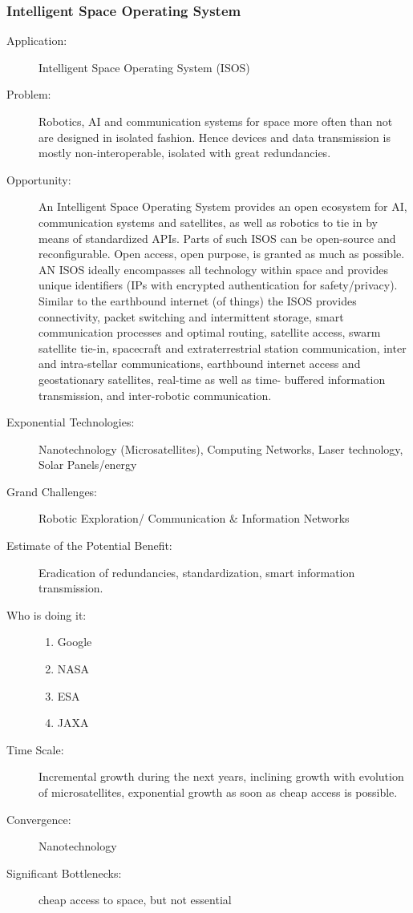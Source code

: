 \subsubsection{Intelligent Space Operating System}
\label{idea:isos}
\begin{description}
\item[Application:] Intelligent Space Operating System (ISOS)

\item[Problem:] Robotics, AI and communication systems for space more often than not are designed
in isolated fashion. Hence devices and data transmission is mostly non-interoperable, isolated
with great redundancies.

\item[Opportunity:] An Intelligent Space Operating System provides an open ecosystem for AI,
communication systems and satellites, as well as robotics to tie in by means of standardized
APIs. Parts of such ISOS can be open-source and reconfigurable. Open access, open purpose, is
granted as much as possible. AN ISOS ideally encompasses all technology within space and
provides unique identifiers (IPs with encrypted authentication for safety/privacy). Similar to the
earthbound internet (of things) the ISOS provides connectivity, packet switching and
intermittent storage, smart communication processes and optimal routing, satellite access, swarm
satellite tie-in, spacecraft and extraterrestrial station communication, inter and intra-stellar
communications, earthbound internet access and geostationary satellites, real-time as well as time-
buffered information transmission, and inter-robotic communication.

\item[Exponential Technologies:]    Nanotechnology (Microsatellites), Computing Networks, Laser
technology, Solar Panels/energy

\item[Grand Challenges:] Robotic Exploration/ Communication \& Information Networks

\item[Estimate of the Potential Benefit:]  Eradication of redundancies, standardization, smart
information transmission.

\item[Who is doing it:]
\hfill\begin{enumerate}
\item Google
\item NASA
\item ESA
\item JAXA
\end{enumerate}

\item[Time Scale:] Incremental growth during the next years, inclining growth with evolution of microsatellites, exponential growth as soon as cheap access is possible.

\item[Convergence:] Nanotechnology

\item[Significant Bottlenecks:] cheap access to space, but not essential
\end{description}
 
